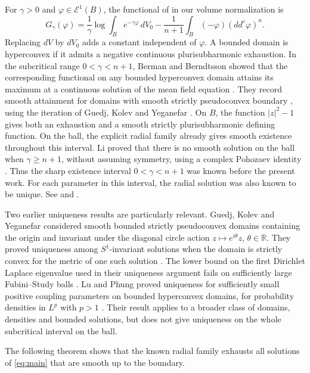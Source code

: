 \documentclass[11pt]{article}
\newcommand{\R}{\mathbb R}
\begin{document}
For $\gamma>0$ and $\varphi\in\mathcal E^1(B)$, the functional of
\cite[Section~4.2]{BB2022} in our volume normalization is
$$
 G_\gamma(\varphi)
 =\frac1\gamma\log\int_B e^{-\gamma\varphi}\,dV_0
   -\frac1{n+1}\int_B(-\varphi)(dd^c\varphi)^n.
$$
Replacing $dV$ by $dV_0$ adds a constant independent of $\varphi$.
A bounded domain is hyperconvex if it admits a negative continuous
plurisubharmonic exhaustion. In the subcritical range $0<\gamma<n+1$,
Berman and Berndtsson showed that the corresponding functional on
any bounded hyperconvex domain attains its maximum at a continuous
solution of the mean field equation \cite[Theorem~7.2]{BB2022}.
They record smooth attainment for domains with smooth strictly
pseudoconvex boundary \cite[Remark~7.3]{BB2022}, using the iteration
of Guedj, Kolev and Yeganefar \cite{GKY2013}. On $B$, the function
$|z|^2-1$ gives both an exhaustion and a smooth strictly
plurisubharmonic defining function.
On the ball, the explicit radial family
already gives smooth existence throughout this interval. Li proved
that there is no smooth solution on the ball when $\gamma\ge n+1$,
without assuming symmetry, using a complex Pohozaev identity
\cite{Li2016}. Thus the sharp existence interval
$0<\gamma<n+1$ was known before the present work. For each
parameter in this interval, the radial solution was also known to
be unique. See \cite[Section~7.3]{BB2022} and \cite{Li2016}.


Two earlier uniqueness results are particularly relevant.
Guedj, Kolev and Yeganefar considered smooth bounded strictly
pseudoconvex domains containing the origin and invariant under the
diagonal circle action $z\mapsto e^{i\theta}z$, $\theta\in\R$. They proved uniqueness
among $S^1$-invariant solutions when the domain is strictly convex for
the metric of one such solution \cite[Theorem~25]{GKY2013}. The lower
bound on the first Dirichlet Laplace eigenvalue used in their
uniqueness argument fails on sufficiently large Fubini--Study balls
\cite{GKYspectral2013}. Lu and Phung proved uniqueness for
sufficiently small positive coupling parameters on bounded
hyperconvex domains, for probability densities in $L^p$ with
$p>1$ \cite[Theorem~1.2]{LP2025}. Their result applies to a
broader class of domains, densities and bounded solutions, but
does not give uniqueness on the whole subcritical interval on
the ball.

The following theorem shows that the known radial family exhausts
all solutions of \eqref{eq:main} that are smooth up to the boundary.
\end{document}

